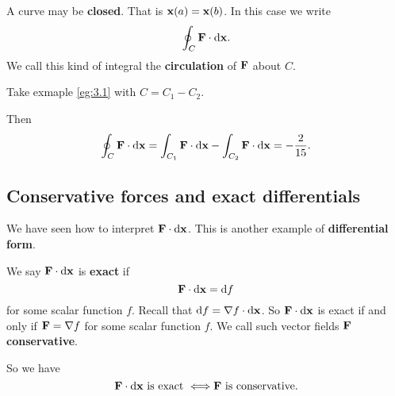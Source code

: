 A curve may be \textbf{closed}. That is $ {\bf x}(a)={\bf x}(b) $. In this case we write 
\[
    \oint_{C}{\bf F}\cdot \mathrm{d}{\bf x}.
\]
We call this kind of integral the \textbf{circulation} of ${\bf F}$ about $C$.

\begin{example}
    Take exmaple \ref{eg:3.1} with $ C=C_1-C_2 $.
    \begin{center}
      \end{center}
      Then 
      \[
          \oint_{C} {\bf F} \cdot\mathrm{d}\mathbf{x} = \int_{C_1} {\bf F} \cdot\mathrm{d}\mathbf{x}-\int_{C_2} {\bf F} \cdot\mathrm{d}\mathbf{x} = -\frac{2}{15}.
      \]
\end{example}

\subsection{Conservative forces and exact differentials}
We have seen how to interpret $ {\bf F}\cdot\mathrm{d}{\bf x} $. This is another example of \textbf{differential form}.
\begin{definition}
    We say ${\bf F}\cdot\mathrm{d}{\bf x}$ is \textbf{exact} if 
    \[
        {\bf F}\cdot\mathrm{d}{\bf x} = \mathrm{d} f
    \]
    for some scalar function $f$. Recall that $ \mathrm{d} f = \nabla f\cdot\mathrm{d}{\bf x} $. So $ {\bf F}\cdot\mathrm{d}{\bf x} $ is exact if and only if $ {\bf F} = \nabla f $ for some scalar function $f$. We call such vector fields ${\bf F}$ \textbf{conservative}.
\end{definition}
So we have 
\[
    {\bf F}\cdot\mathrm{d}{\bf x} \text{ is exact }\Longleftrightarrow {\bf F} \text{ is conservative}.
\]

